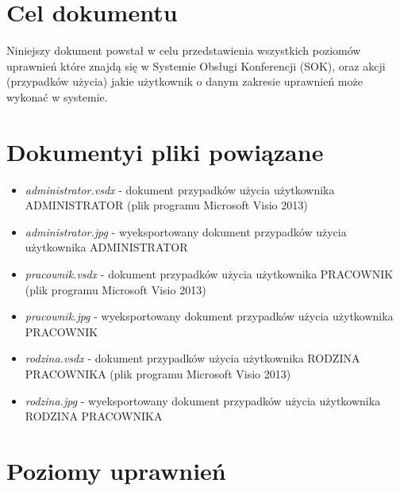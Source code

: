 ﻿\section{Cel dokumentu}
\suppressfloats[t]

Niniejszy dokument powstał w celu przedstawienia wszystkich poziomów uprawnień które znajdą się w Systemie Obsługi Konferencji (SOK), oraz akcji (przypadków użycia) jakie użytkownik o danym zakresie uprawnień może wykonać w systemie. 

\section{Dokumentyi pliki powiązane}

\begin{itemize}
  \item \textit{administrator.vsdx} - dokument przypadków użycia użytkownika ADMINISTRATOR (plik programu Microsoft Visio 2013)
  \item \textit{administrator.jpg} - wyeksportowany dokument przypadków użycia użytkownika ADMINISTRATOR
  \item \textit{pracownik.vsdx} - dokument przypadków użycia użytkownika PRACOWNIK (plik programu Microsoft Visio 2013)
  \item \textit{pracownik.jpg} - wyeksportowany dokument przypadków użycia użytkownika PRACOWNIK
  \item \textit{rodzina.vsdx} - dokument przypadków użycia użytkownika RODZINA PRACOWNIKA (plik programu Microsoft Visio 2013)
  \item \textit{rodzina.jpg} - wyeksportowany dokument przypadków użycia użytkownika RODZINA PRACOWNIKA 
\end{itemize}

\section{Poziomy uprawnień}

